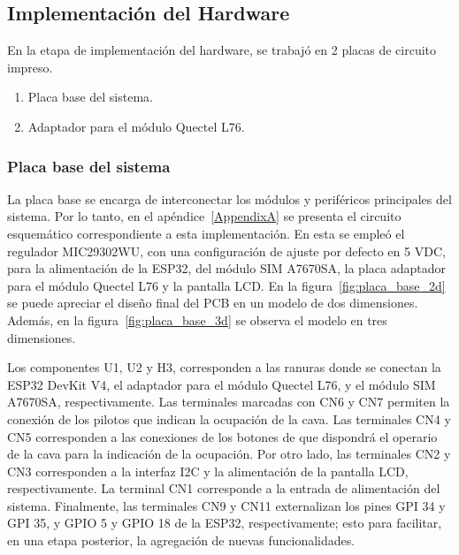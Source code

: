 \subsection{Implementación del Hardware}

En la etapa de implementación del hardware, se trabajó en 2 placas de circuito impreso. 

\begin{enumerate}
    \item Placa base del sistema.
    \item Adaptador para el módulo Quectel L76.
\end{enumerate}



\subsubsection{Placa base del sistema}

La placa base se encarga de interconectar los módulos y periféricos principales del sistema. Por lo tanto, en el apéndice~\ref{AppendixA} se presenta el circuito esquemático correspondiente a esta implementación. En esta se empleó el regulador MIC29302WU, con una configuración de ajuste por defecto en 5 VDC, para la alimentación de la ESP32, del módulo SIM A7670SA, la placa adaptador para el módulo Quectel L76 y la pantalla LCD. En la figura~\ref{fig:placa_base_2d} se puede apreciar el diseño final del PCB en un modelo de dos dimensiones. Además, en la figura~\ref{fig:placa_base_3d} se observa el modelo en tres dimensiones. 

Los componentes U1, U2 y H3, corresponden a las ranuras donde se conectan la ESP32 DevKit V4, el adaptador para el módulo Quectel L76, y el módulo SIM A7670SA, respectivamente. Las terminales marcadas con CN6 y CN7 permiten la conexión de los pilotos que indican la ocupación de la cava. Las terminales CN4 y CN5 corresponden a las conexiones de los botones de que dispondrá el operario de la cava para la indicación de la ocupación. Por otro lado, las terminales CN2 y CN3 corresponden a la interfaz I2C y la alimentación de la pantalla LCD, respectivamente. La terminal CN1 corresponde a la entrada de alimentación del sistema. Finalmente, las terminales CN9 y CN11 externalizan los pines GPI 34 y GPI 35, y GPIO 5 y GPIO 18 de la ESP32, respectivamente; esto para facilitar, en una etapa posterior, la agregación de nuevas funcionalidades. 

